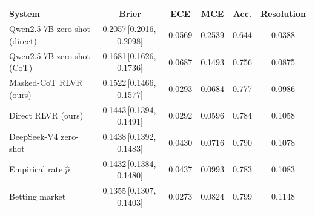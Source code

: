 \begin{tabular}{lccccc}
\toprule
System & Brier & ECE & MCE & Acc. & Resolution \\
\midrule
Qwen2.5-7B zero-shot (direct) & 0.2057\,{\scriptsize[0.2016,\,0.2098]} & 0.0569 & 0.2539 & 0.644 & 0.0388 \\
Qwen2.5-7B zero-shot (CoT) & 0.1681\,{\scriptsize[0.1626,\,0.1736]} & 0.0687 & 0.1493 & 0.756 & 0.0875 \\
Masked-CoT RLVR (ours) & 0.1522\,{\scriptsize[0.1466,\,0.1577]} & 0.0293 & 0.0684 & 0.777 & 0.0986 \\
Direct RLVR (ours) & 0.1443\,{\scriptsize[0.1394,\,0.1491]} & 0.0292 & 0.0596 & 0.784 & 0.1058 \\
DeepSeek-V4 zero-shot & 0.1438\,{\scriptsize[0.1392,\,0.1483]} & 0.0430 & 0.0716 & 0.790 & 0.1078 \\
\midrule
Empirical rate $\hat{p}$ & 0.1432\,{\scriptsize[0.1384,\,0.1480]} & 0.0437 & 0.0993 & 0.783 & 0.1083 \\
Betting market & 0.1355\,{\scriptsize[0.1307,\,0.1403]} & 0.0273 & 0.0824 & 0.799 & 0.1148 \\
\bottomrule
\end{tabular}
